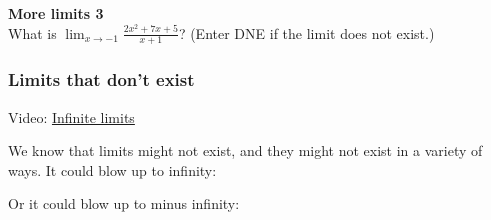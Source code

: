 \documentclass[pdftex, brazil, 12pt, twoside]{article}
\begin{document}
\begin{exercise}
  \textbf{More limits 3}\\
  What is $\displaystyle \lim_{x \to -1}\frac{2x^2+7x+5}{x+1}$?
  (Enter DNE if the limit does not exist.)
\end{exercise}

\subsubsection{Limits that don't exist}
\label{u0-lim-quo-dont-exist}

Video: \href{https://www.youtube.com/watch?v=z-4AtzDVlfE}{Infinite limits}

We know that limits might not exist,
and they might not exist in a variety of ways.
It could blow up to infinity:

\begin{figure}[H]
  \begin{center}
  \end{center}
\end{figure}

Or it could blow up
to minus infinity:

\begin{figure}[H]
  \begin{center}
  \end{center}
\end{figure}
\end{document}

